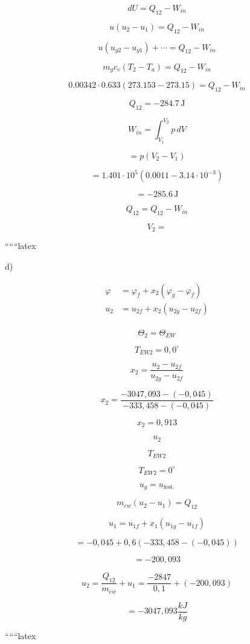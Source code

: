\[
dU = Q_{12} - W_{in}
\]

\[
u(u_2 - u_1) = Q_{12} - W_{in}
\]

\[
u(u_{g2} - u_{g1}) + \cdots = Q_{12} - W_{in}
\]

\[
m_{g} c_v (T_2 - T_a) = Q_{12} - W_{in}
\]

\[
0.00342 \cdot 0.633 (273.153 - 273.15) = Q_{12} - W_{in}
\]

\[
Q_{12} = -284.7 \, \text{J}
\]

\[
W_{in} = \int_{V_1}^{V_2} p \, dV
\]

\[
= p (V_2 - V_1)
\]

\[
= 1.401 \cdot 10^5 \left(0.0011 - 3.14 \cdot 10^{-3}\right)
\]

\[
= -285.6 \, \text{J}
\]

\[
Q_{12} = Q_{12} - W_{in}
\]

\[
V_2 =
\]

``````latex


d)

\begin{align*}
\varphi &= \varphi_f + x_2 (\varphi_g - \varphi_f) \\
u_2 &= u_{2f} + x_2 (u_{2g} - u_{2f}) \\
\end{align*}

\[
\Theta_2 = \Theta_{EW}
\]

\[
T_{EW2} = 0,0^\circ
\]

\[
x_2 = \frac{u_2 - u_{2f}}{u_{2g} - u_{2f}}
\]

\[
x_2 = \frac{-3047,093 - (-0,045)}{-333,458 - (-0,045)}
\]

\[
x_2 = 0,913
\]

\[
u_2
\]

\[
T_{EW2}
\]

\[
T_{EW2} = 0^\circ
\]

\[
u_g = u_{\text{fest.}}
\]

\[
m_{ew}(u_2 - u_1) = Q_{12}
\]

\[
u_1 = u_{1f} + x_1 (u_{1g} - u_{1f})
\]

\[
= -0,045 + 0,6 (-333,458 - (-0,045))
\]

\[
= -200,093
\]

\[
u_2 = \frac{Q_{12}}{m_{ew}} + u_1 = \frac{-2847}{0,1} + (-200,093)
\]

\[
= -3047,093 \frac{kJ}{kg}
\]

``````latex


